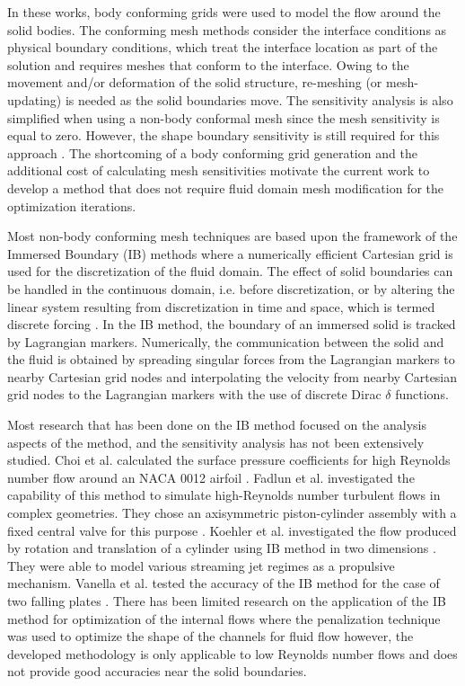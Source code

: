 \documentclass[12pt]{aiaa-pretty}
\begin{document}
In these works, body conforming grids were used to model the flow around the solid bodies. The conforming mesh methods consider the interface conditions as physical boundary conditions, which treat the interface location as part of the solution and requires meshes that conform to the interface. Owing to the movement and/or deformation of the solid structure, re-meshing (or mesh-updating) is needed as the solid boundaries move. The sensitivity analysis is also simplified when using a non-body conformal mesh since the mesh sensitivity is equal to zero. However, the shape boundary sensitivity is still required for this approach \cite{liu2013boundary}. The shortcoming of a body conforming grid generation and the additional cost of calculating mesh sensitivities motivate the current work to develop a method that does not require fluid domain mesh modification for the optimization iterations.

Most non-body conforming mesh techniques are based upon the framework of the Immersed Boundary (IB) methods where a numerically efficient Cartesian grid is used for the discretization of the fluid domain. The effect of solid boundaries can be handled in the continuous domain, i.e. before discretization, or by altering the linear system resulting from discretization in time and space, which is termed discrete forcing \cite{mittal2005immersed}. In the IB method, the boundary of an immersed solid is tracked by Lagrangian markers. Numerically, the communication between the solid and the fluid is obtained by spreading singular forces from the Lagrangian markers to nearby Cartesian grid nodes and interpolating the velocity from nearby Cartesian grid nodes to the Lagrangian markers with the use of discrete Dirac $\delta$ functions.

Most research that has been done on the IB method focused on the analysis aspects of the method, and the sensitivity analysis has not been extensively studied. Choi et al. calculated the surface pressure coefficients for high Reynolds number flow around an NACA 0012 airfoil \cite{choi2007immersed}. Fadlun et al. investigated the capability of this method to simulate high-Reynolds number turbulent flows in complex geometries. They chose an axisymmetric piston-cylinder assembly with a fixed central valve for this purpose \cite{fadlun2000combined}. Koehler et al. investigated the flow produced by rotation and translation of a cylinder using IB method in two dimensions \cite{koehler2015flows}. They were able to model various streaming jet regimes as a propulsive mechanism. Vanella et al. tested the accuracy of the IB method for the case of two falling plates \cite{vanella2010direct}. There has been limited research on the application of the IB method for optimization of the internal flows where the penalization technique was used to optimize the shape of the channels for fluid flow \cite{kreissl2012levelset} however, the developed methodology is only applicable to low Reynolds number flows and does not provide good accuracies near the solid boundaries.
\end{document}
